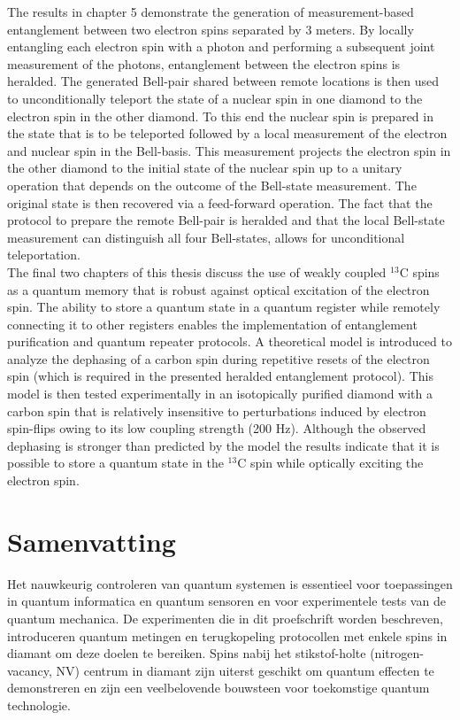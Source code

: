 The results in chapter 5 demonstrate the generation of measurement-based entanglement between two electron spins separated by 3 meters. By locally entangling each electron spin with a photon and performing a subsequent joint measurement of the photons, entanglement between the electron spins is heralded. The generated Bell-pair shared between remote locations is then used to unconditionally teleport the state of a nuclear spin in one diamond to the electron spin in the other diamond. To this end the nuclear spin is prepared in the state that is to be teleported followed by a local measurement of the electron and nuclear spin in the Bell-basis. This measurement projects the electron spin in the other diamond to the initial state of the nuclear spin up to a unitary operation that depends on the outcome of the Bell-state measurement. The original state is then recovered via a feed-forward operation. The fact that the protocol to prepare the remote Bell-pair is heralded and that the local Bell-state measurement can distinguish all four Bell-states, allows for unconditional teleportation. \\

The final two chapters of this thesis discuss the use of weakly coupled $^{13}$C spins as a quantum memory that is robust against optical excitation of the electron spin. The ability to store a quantum state in a quantum register while remotely connecting it to other registers enables the implementation of entanglement purification and quantum repeater protocols. A theoretical model is introduced to analyze the dephasing of a carbon spin during repetitive resets of the electron spin (which is required in the presented heralded entanglement protocol). This model is then tested experimentally in an isotopically purified diamond with a carbon spin that is relatively insensitive to perturbations induced by electron spin-flips owing to its low coupling strength (200 Hz). Although the observed dephasing is stronger than predicted by the model the results indicate that it is possible to store a quantum state in the $^{13}$C spin while optically exciting the electron spin.

\chapter{Samenvatting}

Het nauwkeurig controleren van quantum systemen is essentieel voor toepassingen in quantum informatica en quantum sensoren en voor experimentele tests van de quantum mechanica. De experimenten die in dit proefschrift worden beschreven, introduceren quantum metingen en terugkopeling protocollen met enkele spins in diamant om deze doelen te bereiken. Spins nabij het stikstof-holte (nitrogen-vacancy, NV) centrum in diamant zijn uiterst geschikt om quantum effecten te demonstreren en zijn een veelbelovende bouwsteen voor toekomstige quantum technologie. \\

